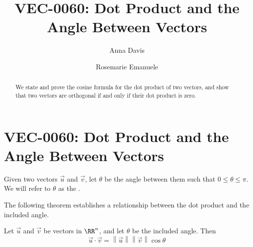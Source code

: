 \documentclass{ximera}
\author{Anna Davis \and Rosemarie Emanuele} \title{VEC-0060:  Dot Product and the Angle Between Vectors} \license{CC-BY 4.0}
\newcommand\norm[1]{\left\lVert#1\right\rVert}
\begin{document}
\begin{abstract}
 We state and prove the cosine formula for the dot product of two vectors, and show that two vectors are orthogonal if and only if their dot product is zero.
\end{abstract}
\maketitle

\section*{VEC-0060:  Dot Product and the Angle Between Vectors}

Given two vectors $\vec{u}$ and $\vec{v}$, let $\theta$ be the angle between them such that $0\leq\theta\leq \pi$.  We will refer to $\theta$ as the .

\begin{image}[2in]
\end{image}

The following theorem establishes a relationship between the dot product and the included angle.

  \begin{theorem}\label{th:dotproductcosine} Let $\vec{u}$ and $\vec{v}$ be vectors in $\RR^n$, and let $\theta$ be the included angle.  Then
  \begin{equation*} \label{matlintrans}
 \vec{u}\cdot\vec{v}=\norm{\vec{u}}\norm{\vec{v}}\cos \theta
\end{equation*}
\end{theorem}
\end{document}
